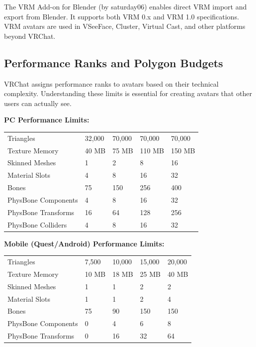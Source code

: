 The VRM Add-on for Blender (by saturday06) enables direct VRM import and export from Blender. It supports both VRM 0.x and VRM 1.0 specifications. VRM avatars are used in VSeeFace, Cluster, Virtual Cast, and other platforms beyond VRChat.


\subsection{Performance Ranks and Polygon Budgets}

VRChat assigns performance ranks to avatars based on their technical complexity. Understanding these limits is essential for creating avatars that other users can actually see.

\textbf{PC Performance Limits:}

\begin{center}
\begin{tabularx}{\textwidth}{L{3cm}C{2cm}C{2cm}C{2cm}C{2cm}}
\toprule
{}
 &  &  &  &  \\
\midrule
Triangles & 32,000 & 70,000 & 70,000 & 70,000 \\
Texture Memory & 40 MB & 75 MB & 110 MB & 150 MB \\
Skinned Meshes & 1 & 2 & 8 & 16 \\
Material Slots & 4 & 8 & 16 & 32 \\
Bones & 75 & 150 & 256 & 400 \\
PhysBone Components & 4 & 8 & 16 & 32 \\
PhysBone Transforms & 16 & 64 & 128 & 256 \\
PhysBone Colliders & 4 & 8 & 16 & 32 \\
\bottomrule
\end{tabularx}
\end{center}

\vspace{0.5em}

\textbf{Mobile (Quest/Android) Performance Limits:}

\begin{center}
\begin{tabularx}{\textwidth}{L{3cm}C{2cm}C{2cm}C{2cm}C{2cm}}
\toprule
{}
 &  &  &  &  \\
\midrule
Triangles & 7,500 & 10,000 & 15,000 & 20,000 \\
Texture Memory & 10 MB & 18 MB & 25 MB & 40 MB \\
Skinned Meshes & 1 & 1 & 2 & 2 \\
Material Slots & 1 & 1 & 2 & 4 \\
Bones & 75 & 90 & 150 & 150 \\
PhysBone Components & 0 & 4 & 6 & 8 \\
PhysBone Transforms & 0 & 16 & 32 & 64 \\
\bottomrule
\end{tabularx}
\end{center}

